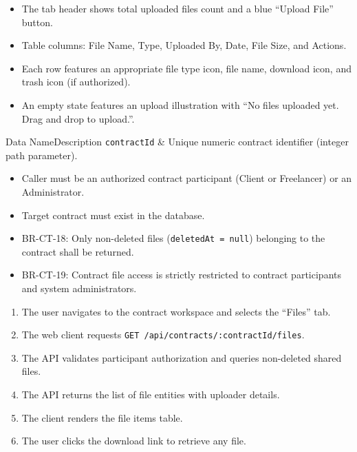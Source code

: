 \begin{itemize}[leftmargin=1.6em,topsep=3pt,itemsep=2pt,parsep=0pt,label=$\bullet$]
      \item The tab header shows total uploaded files count and a blue ``Upload File'' button.
      \item Table columns: File Name, Type, Uploaded By, Date, File Size, and Actions.
      \item Each row features an appropriate file type icon, file name, download icon, and trash icon (if authorized).
      \item An empty state features an upload illustration with ``No files uploaded yet. Drag and drop to upload.''.
\end{itemize}


\begin{specdatatable}{Data Name}{Description}
      \texttt{contractId} & Unique numeric contract identifier (integer path parameter).\\ \hline
\end{specdatatable}

\begin{itemize}[leftmargin=1.6em,topsep=3pt,itemsep=2pt,parsep=0pt,label=$\bullet$]
      \item Caller must be an authorized contract participant (Client or Freelancer) or an Administrator.
      \item Target contract must exist in the database.
\end{itemize}

\begin{itemize}[leftmargin=1.6em,topsep=3pt,itemsep=2pt,parsep=0pt,label=$\bullet$]\brrulelist
      \item BR-CT-18: Only non-deleted files (\texttt{deletedAt = null}) belonging to the contract shall be returned.
      \item BR-CT-19: Contract file access is strictly restricted to contract participants and system administrators.
\end{itemize}

\begin{enumerate}[leftmargin=1.8em,topsep=3pt,itemsep=2pt,parsep=0pt]
      \item The user navigates to the contract workspace and selects the ``Files'' tab.
      \item The web client requests \texttt{GET /api/contracts/:contractId/files}.
      \item The API validates participant authorization and queries non-deleted shared files.
      \item The API returns the list of file entities with uploader details.
      \item The client renders the file items table.
      \item The user clicks the download link to retrieve any file.
\end{enumerate}

